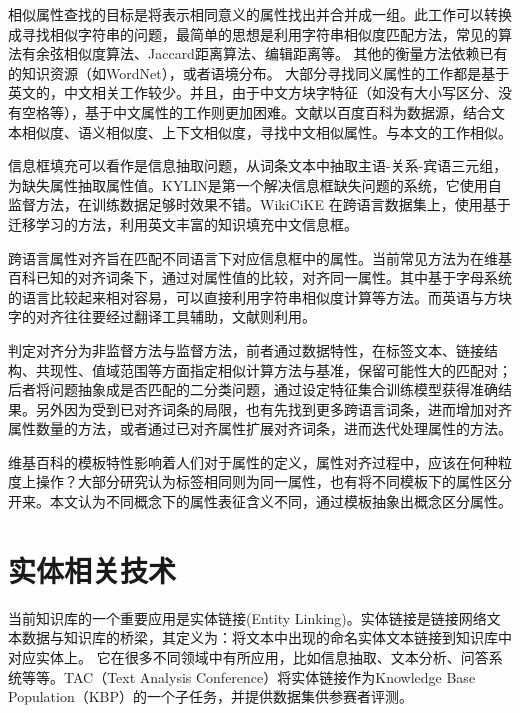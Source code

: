 {\heiti 相似属性查找}的目标是将表示相同意义的属性找出并合并成一组。此工作可以转换成寻找相似字符串的问题，最简单的思想是利用字符串相似度匹配方法，常见的算法有余弦相似度算法、Jaccard距离算法、编辑距离等。
其他的衡量方法依赖已有的知识资源（如WordNet）\cite{yang2005measuring}，或者语境分布\cite{pantel2009web}。
大部分寻找同义属性的工作都是基于英文的，中文相关工作较少。并且，由于中文方块字特征（如没有大小写区分、没有空格等），基于中文属性的工作则更加困难。文献\cite{liu2014extracting}以百度百科为数据源，结合文本相似度、语义相似度、上下文相似度，寻找中文相似属性。与本文的工作相似。

{\heiti 信息框填充}可以看作是信息抽取问题，从词条文本中抽取主语-关系-宾语三元组，为缺失属性抽取属性值。KYLIN\cite{wu2007autonomously}是第一个解决信息框缺失问题的系统，它使用自监督方法，在训练数据足够时效果不错。WikiCiKE\cite{wang2013transfer} 在跨语言数据集上，使用基于迁移学习的方法，利用英文丰富的知识填充中文信息框。

{\heiti 跨语言属性对齐}旨在匹配不同语言下对应信息框中的属性。当前常见方法为在维基百科已知的对齐词条下，通过对属性值的比较，对齐同一属性。其中基于字母系统的语言比较起来相对容易，可以直接利用字符串相似度计算等方法\cite{bouma2009cross}。而英语与方块字的对齐往往要经过翻译工具辅助\cite{fu2009cross}，文献\cite{nguyen2011multilingual}则利用。

判定对齐分为非监督方法与监督方法，前者通过数据特性，在标签文本、链接结构、共现性、值域范围等方面指定相似计算方法与基准，保留可能性大的匹配对\cite{nguyen2011multilingual,lin2011unsupervised}；后者将问题抽象成是否匹配的二分类问题\cite{adar2009information}，通过设定特征集合训练模型获得准确结果。另外因为受到已对齐词条的局限，也有先找到更多跨语言词条，进而增加对齐属性数量的方法\cite{rinser2013cross}，或者通过已对齐属性扩展对齐词条，进而迭代处理属性的方法\cite{nguyen2013slint}。

维基百科的模板特性影响着人们对于属性的定义，属性对齐过程中，应该在何种粒度上操作？大部分研究认为标签相同则为同一属性\cite{adar2009information,nguyen2011multilingual}，也有将不同模板下的属性区分开来\cite{bouma2009cross}。本文认为不同概念下的属性表征含义不同，通过模板抽象出概念区分属性。

\section{实体相关技术}
\label{sec:entity-research}

当前知识库的一个重要应用是实体链接(Entity Linking)。实体链接是链接网络文本数据与知识库的桥梁，其定义为：将文本中出现的命名实体文本链接到知识库中对应实体上。 
它在很多不同领域中有所应用，比如信息抽取\cite{lin2012entity,nakashole2012patty}、文本分析\cite{gattani2013entity}、问答系统\cite{gattani2013entity,welty2012comparison}等等。TAC（Text Analysis Conference）将实体链接作为Knowledge Base Population（KBP）的一个子任务，并提供数据集供参赛者评测。

